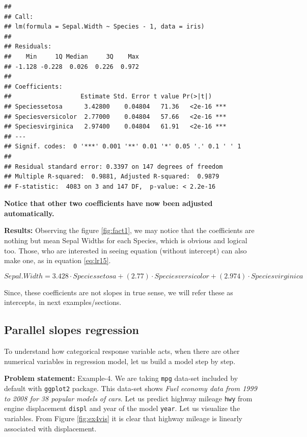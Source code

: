 \documentclass[
]{book}
\begin{document}
\begin{verbatim}
## 
## Call:
## lm(formula = Sepal.Width ~ Species - 1, data = iris)
## 
## Residuals:
##    Min     1Q Median     3Q    Max 
## -1.128 -0.228  0.026  0.226  0.972 
## 
## Coefficients:
##                   Estimate Std. Error t value Pr(>|t|)    
## Speciessetosa      3.42800    0.04804   71.36   <2e-16 ***
## Speciesversicolor  2.77000    0.04804   57.66   <2e-16 ***
## Speciesvirginica   2.97400    0.04804   61.91   <2e-16 ***
## ---
## Signif. codes:  0 '***' 0.001 '**' 0.01 '*' 0.05 '.' 0.1 ' ' 1
## 
## Residual standard error: 0.3397 on 147 degrees of freedom
## Multiple R-squared:  0.9881, Adjusted R-squared:  0.9879 
## F-statistic:  4083 on 3 and 147 DF,  p-value: < 2.2e-16
\end{verbatim}

\textbf{Notice that other two coefficients have now been adjusted automatically.}

\textbf{Results:} Observing the figure \ref{fig:fact1}, we may notice that the coefficients are nothing but mean Sepal Widths for each Species, which is obvious and logical too. Those, who are interested in seeing equation (without intercept) can also make one, as in equation \eqref{eq:lr15}.

\begin{equation} 
{Sepal.Width} = 3.428\cdot{Speciessetosa} + (2.77)\cdot{Speciesversicolor} + (2.974)\cdot{Speciesvirginica}
\label{eq:lr15}
\end{equation}

Since, these coefficients are not slopes in true sense, we will refer these as intercepts, in next examples/sections.

\hypertarget{parallel-slopes-regression}{%
\subsection{Parallel slopes regression}\label{parallel-slopes-regression}}

To understand how categorical response variable acts, when there are other numerical variables in regression model, let us build a model step by step.

\textbf{Problem statement:} Example-4. We are taking \texttt{mpg} data-set included by default with \texttt{ggplot2} package. This data-set shows \emph{Fuel economy data from 1999 to 2008 for 38 popular models of cars}. Let us predict highway mileage \texttt{hwy} from engine displacement \texttt{displ} and year of the model \texttt{year}. Let us visualize the variables. From Figure \ref{fig:ex4vis} it is clear that highway mileage is linearly associated with displacement.
\end{document}
